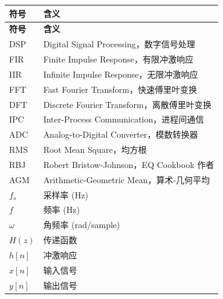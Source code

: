 ﻿\documentclass[12pt,a4paper,oneside]{ctexbook}
\begin{document}
\begin{longtable}{p{3cm}p{10cm}}
    \toprule
    \textbf{符号} & \textbf{含义} \\
    \midrule
    \endfirsthead
    \toprule
    \textbf{符号} & \textbf{含义} \\
    \midrule
    \endhead
    \bottomrule
    \endfoot
    DSP & Digital Signal Processing，数字信号处理 \\
    FIR & Finite Impulse Response，有限冲激响应 \\
    IIR & Infinite Impulse Response，无限冲激响应 \\
    FFT & Fast Fourier Transform，快速傅里叶变换 \\
    DFT & Discrete Fourier Transform，离散傅里叶变换 \\
    IPC & Inter-Process Communication，进程间通信 \\
    ADC & Analog-to-Digital Converter，模数转换器 \\
    RMS & Root Mean Square，均方根 \\
    RBJ & Robert Bristow-Johnson，EQ Cookbook 作者 \\
    AGM & Arithmetic-Geometric Mean，算术-几何平均 \\
    \(f_s\) & 采样率 (Hz) \\
    \(f\) & 频率 (Hz) \\
    \(\omega\) & 角频率 (rad/sample) \\
    \(H(z)\) & 传递函数 \\
    \(h[n]\) & 冲激响应 \\
    \(x[n]\) & 输入信号 \\
    \(y[n]\) & 输出信号 \\
    \bottomrule
\end{longtable}
\end{document}

